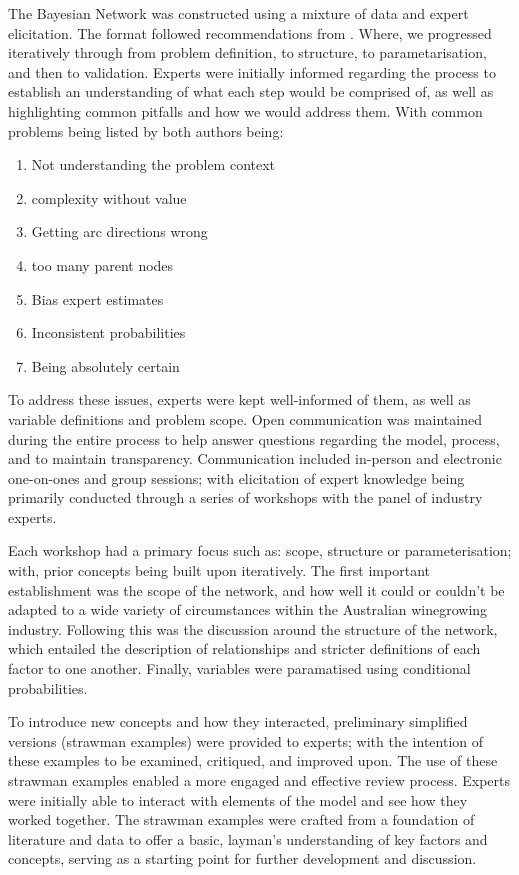 The Bayesian Network was constructed using a mixture of data and expert elicitation. The format followed recommendations from \cite{korbBayesianArtificialIntelligence2011,pitchforthProposedValidationFramework2013}. Where, we progressed iteratively through from problem definition, to structure, to parametarisation, and then to validation. Experts were initially informed regarding the process to establish an understanding of what each step would be comprised of, as well as highlighting common pitfalls and how we would address them. With common problems being listed by both authors being:
\begin{enumerate}
        \item Not understanding the problem context
        \item complexity without value
        \item Getting arc directions wrong
        \item too many parent nodes
        \item Bias expert estimates
        \item Inconsistent probabilities
        \item Being absolutely certain
\end{enumerate}
To address these issues, experts were kept well-informed of them, as well as variable definitions and problem scope. Open communication was maintained during the entire process to help answer questions regarding the model, process, and to maintain transparency. Communication included in-person and electronic one-on-ones and group sessions; with elicitation of expert knowledge being primarily conducted through a series of workshops with the panel of industry experts.

Each workshop had a primary focus such as: scope, structure or parameterisation; with, prior concepts being built upon iteratively. The first important establishment was the scope of the network, and how well it could or couldn't be adapted to a wide variety of circumstances within the Australian winegrowing industry. Following this was the discussion around the structure of the network, which entailed the description of relationships and stricter definitions of each factor to one another. Finally, variables were paramatised using conditional probabilities.

To introduce new concepts and how they interacted, preliminary simplified versions (strawman examples) were provided to experts; with the intention of these examples to be examined, critiqued, and improved upon. The use of these strawman examples enabled a more engaged and effective review process. Experts were initially able to interact with elements of the model and see how they worked together. The strawman examples were crafted from a foundation of literature and data to offer a basic, layman's understanding of key factors and concepts, serving as a starting point for further development and discussion. 

